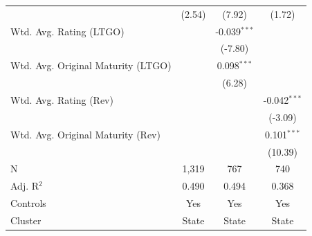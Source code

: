 \begin{tabular*}{\textwidth}{@{\extracolsep{\fill}}lccc}
                                      & (2.54)                       & (7.92)                       & (1.72)\\   
   Wtd. Avg. Rating (LTGO)            &                               & -0.039$^{***}$                &   \\   
                                      &                               & (-7.80)                      &   \\   
   Wtd. Avg. Original Maturity (LTGO) &                               & 0.098$^{***}$                 &   \\   
                                      &                               & (6.28)                       &   \\   
   Wtd. Avg. Rating (Rev)             &                               &                               & -0.042$^{***}$\\   
                                      &                               &                               & (-3.09)\\   
   Wtd. Avg. Original Maturity (Rev)  &                               &                               & 0.101$^{***}$\\   
                                      &                               &                               & (10.39)\\   
   \hline
   N                       & 1,319                         & 767                           & 740\\  
   Adj. R$^2$                     & 0.490                         & 0.494                         & 0.368\\  
   Controls                   & Yes & Yes & Yes\\
   Cluster              & State & State & State\\  
   \bottomrule
\end{tabular*}
\par\endgroup
